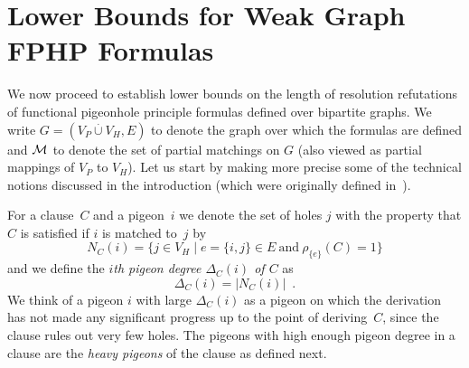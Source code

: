 \documentclass{theoretics}
\newcommand{\set}[1]{\{ #1 \}}
\newcommand{\setdescr}[3][\mid]{\set{ #2 #1 #3 }}
\newcommand{\setsize}[1]{\lvert#1\rvert}
\newcommand{\disjointunion}{\overset{.}{\cup}}
\newcommand{\introduceterm}[1]{{\emph{#1}}}
\newcommand{\eqperiod}{\enspace .}
\newcommand{\heavy}{heavy\xspace}
\newcommand{\neigh}[2][]{N_{{#1}}(#2)}
\renewcommand{\deg}[2][XXXXXXXXXXXX]{\Delta_{#1}(#2)}
\newcommand{\V}[1][]{V_{#1}}
\newcommand{\Vp}{\V[P]}
\newcommand{\Vh}{\V[H]}
\newcommand{\matchboolof}[2]{\rho_{#1}(#2)}
\newcommand{\matchings}[1][]{\ensuremath \mathcal{M}_{{#1}}}
\numberwithin{equation}{section}
\begin{document}
 

\section{Lower Bounds for Weak Graph FPHP Formulas }
\label{sec:GFPHP}

We now proceed to establish lower bounds on the length of resolution
refutations of 
functional pigeonhole principle formulas defined over bipartite graphs.
We write
$G = (\Vp \disjointunion \Vh, E)$
to denote the graph over which the formulas are defined and $\matchings$ 
to denote
the set of partial matchings on $G$
(also viewed as partial mappings of $\Vp$ to $\Vh$).
Let us start by making more
precise some of the technical notions 
discussed in the introduction
(which were originally defined 
in~\cite{Razborov01ImprovedResolutionLowerBoundsWPHP}).


For a 
clause~$C$ and a 
pigeon~$i$ we denote the 
set of
holes $j$ with
the property that $C$ is satisfied if $i$ is matched to~$j$ by
\begin{equation}
	\neigh[C]{i} = \setdescr{ j \in \Vh }{ e=\set{i, j} \in 
	E~\text{and}~\matchboolof{\set{e}}{C} = 1 }
\end{equation}
and we define
the \introduceterm{$i$th pigeon degree 
  $\deg[C]{i}$ 
  of $C$} 
as  
\begin{equation}
  \label{eq:pig-deg}
  \deg[C]{i} 
  = \setsize{ \neigh[C]{i} } 
  \eqperiod
\end{equation}
We think
of a pigeon $i$ with large $\deg[C]{i}$ as a pigeon on which the
derivation has not made any significant progress up to the point of
deriving~$C$, since the clause rules out very few holes. 
The pigeons with high enough pigeon degree in a
clause are the \emph{\heavy pigeons} of the clause
as defined next.
\end{document}
